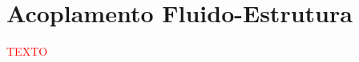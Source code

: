 \documentclass[_ArquivoPrincipal.tex]{subfiles}
\begin{document}
\section{Acoplamento Fluido-Estrutura} \label{AFE}

\textcolor{red}{TEXTO}
\end{document}
